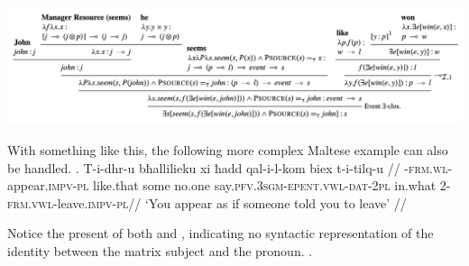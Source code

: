 \documentclass[11pt]{article}
\begin{document}
\includegraphics[scale=0.25]{SCR-20240317-bvtm.png}

With something like this, the following more complex Maltese example can also be handled.
\ex. \begingl
  \gla T-i-dhr-u bħallilieku xi ħadd qal-i-l-kom biex t-i-tilq-u //
  -\textsc{frm.wl}-appear.\textsc{impv-pl} like.that some no.one say.\textsc{pfv.3sgm-epent.vwl-dat-2pl} in.what 2-\textsc{frm.vwl}-leave.\textsc{impv-pl}//
  \glft `You appear as if someone told you to leave' //
\endgl

Notice the present of both \avm{\1} and \avm{\2}, indicating no syntactic representation of the identity between the matrix subject and the pronoun.
\ex. 
\end{document}
